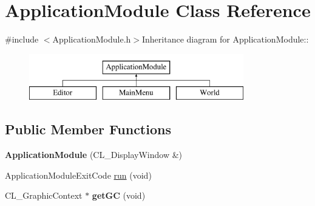 \hypertarget{classApplicationModule}{
\section{ApplicationModule Class Reference}
\label{classApplicationModule}
}


{\ttfamily \#include $<$ApplicationModule.h$>$}Inheritance diagram for ApplicationModule::\begin{figure}[H]
\begin{center}
\leavevmode
\includegraphics[height=2cm]{classApplicationModule}
\end{center}
\end{figure}
\subsection*{Public Member Functions}
\begin{DoxyCompactItemize}
\item 
\hypertarget{classApplicationModule_a64c223f48f98d9ac304ab0c3d1e69a91}{
{\bfseries ApplicationModule} (CL\_\-DisplayWindow \&)}
\label{classApplicationModule_a64c223f48f98d9ac304ab0c3d1e69a91}

\item 
ApplicationModuleExitCode \hyperlink{classApplicationModule_a72494b92d2b093e0827893f527535a1f}{run} (void)
\item 
\hypertarget{classApplicationModule_a685f7d1d6d235b3ac7ee1d34fe80b801}{
CL\_\-GraphicContext $\ast$ {\bfseries getGC} (void)}
\label{classApplicationModule_a685f7d1d6d235b3ac7ee1d34fe80b801}

\end{DoxyCompactItemize}
